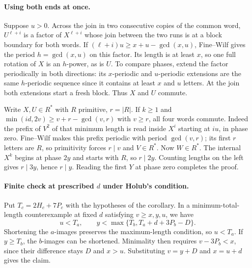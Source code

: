 \paragraph{Using both ends at once.}
Suppose $u>0$. Across the join in two consecutive copies of the
common word, $U^{\ell+i}$ is a factor of $X^{\ell+i}$ whose join
between the two runs is at a block boundary for both words.
If $(\ell+i)u\ge x+u-\gcd(x,u)$, Fine--Wilf gives the period
$h=\gcd(x,u)$ on this factor. Its length is at least $x$, so one
full rotation of $X$ is an $h$-power, as is $U$.
To compare phases, extend the factor periodically in both directions:
its $x$-periodic and $u$-periodic extensions are the same $h$-periodic
sequence since it contains at least $x$ and $u$ letters. At the join
both extensions start a fresh block. Thus $X$ and $U$ commute.

Write $X,U\in R^*$ with $R$ primitive, $r=|R|$. If $k\ge1$ and
$\min(id,2v)\ge v+r-\gcd(v,r)$ with $v\ge r$, all four words commute.
Indeed the prefix of $V^2$ of that minimum length is read inside
$X^i$ starting at $iu$, in phase zero. Fine--Wilf makes this prefix
periodic with period $\gcd(v,r)$; its first $r$ letters are $R$, so
primitivity forces $r\mid v$ and $V\in R^*$. Now $W\in R^*$.
The internal $X^k$ begins at phase $2y$ and starts with $R$, so
$r\mid 2y$. Counting lengths on the left gives $r\mid 3y$, hence
$r\mid y$. Reading the first $Y$ at phase zero completes the proof.

\paragraph{Finite check at prescribed $d$ under Holub's condition.}
Put $T_c=2H_c+7P_c$ with the hypotheses of the corollary.
In a minimum-total-length counterexample at fixed $d$ satisfying
$v\ge x,y,u$, we have
\[
 u<T_a,\qquad
 y<\max\{T_b,T_a+d+3P_b-D\}.
\]
Shortening the $a$-images preserves the maximum-length condition,
so $u<T_a$. If $y\ge T_b$, the $b$-images can be shortened.
Minimality then requires $v-3P_b<x$, since their difference stays
$D$ and $x>u$. Substituting $v=y+D$ and $x=u+d$ gives the claim.
